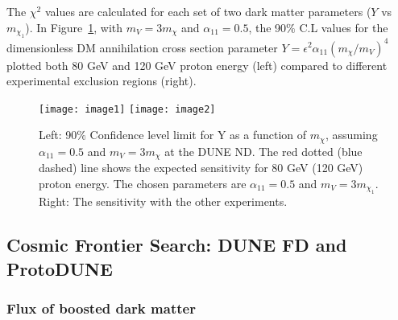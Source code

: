 

The $\chi^{2}$ values are calculated for each set of two dark matter parameters ($Y$ vs $m_{\chi_1}$).
In Figure~\ref{fig:chisq}, with $m_{V} = 3m_{\chi}$ and $\alpha_{11}=0.5$,  the 90$\%$ C.L  values for the dimensionless DM annihilation
cross section parameter $Y = \epsilon^{2}\alpha_{11} (m_{\chi}/m_{V})^4$ plotted both 80 GeV and 120 GeV proton energy (left) compared to different experimental exclusion regions (right).
 \begin{figure}[t]
 \centering
 \texttt{[image: image1]}
 \texttt{[image: image2]}
 \caption{\label{fig:chisq} Left: 90$\%$ Confidence level limit for Y as a function of $m_{\chi}$, assuming $\alpha_{11}=0.5$ and $m_{V} = 3m_{\chi}$ at the DUNE ND. 
The red dotted (blue dashed) line shows the expected sensitivity for 80 GeV (120 GeV) proton energy. 
The chosen parameters are $\alpha_{11}=0.5$ and $m_{V}= 3m_{\chi_1}$.
Right: The sensitivity with the other experiments.}
 \end{figure}

\subsection{Cosmic Frontier Search: DUNE FD and ProtoDUNE \label{sec:FD}}

\subsubsection{Flux of boosted dark matter \label{sec:flux}}

